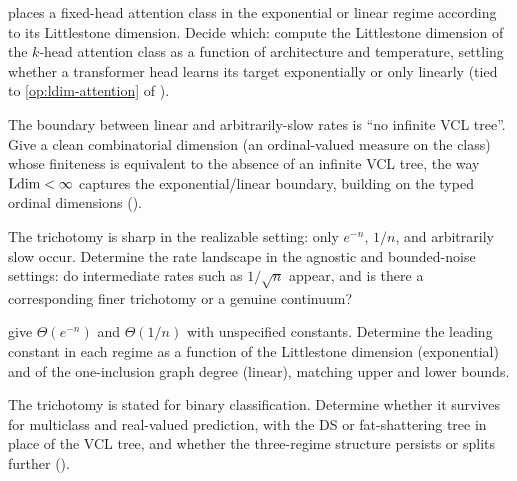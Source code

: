\begin{openprob}
\label{op:attention-regime}
 places a fixed-head attention class in the exponential or linear regime according to its Littlestone dimension.  Decide which: compute the Littlestone dimension of the $k$-head attention class as a function of architecture and temperature, settling whether a transformer head learns its target exponentially or only linearly (tied to \cref{op:ldim-attention} of ).
\end{openprob}

\begin{openprob}
\label{op:vcl-characterization}
The boundary between linear and arbitrarily-slow rates is ``no infinite VCL tree''.  Give a clean combinatorial dimension (an ordinal-valued measure on the class) whose finiteness is equivalent to the absence of an infinite VCL tree, the way $\mathrm{Ldim} < \infty$ captures the exponential/linear boundary, building on the typed ordinal dimensions ().
\end{openprob}

\begin{openprob}
\label{op:intermediate-rates}
The trichotomy is sharp in the realizable setting: only $e^{-n}$, $1/n$, and arbitrarily slow occur.  Determine the rate landscape in the agnostic and bounded-noise settings: do intermediate rates such as $1/\sqrt{n}$ appear, and is there a corresponding finer trichotomy or a genuine continuum?
\end{openprob}

\begin{openprob}
\label{op:rate-constants}
 give $\Theta(e^{-n})$ and $\Theta(1/n)$ with unspecified constants.  Determine the leading constant in each regime as a function of the Littlestone dimension (exponential) and of the one-inclusion graph degree (linear), matching upper and lower bounds.
\end{openprob}

\begin{openprob}
\label{op:universal-multiclass}
The trichotomy is stated for binary classification.  Determine whether it survives for multiclass and real-valued prediction, with the DS or fat-shattering tree in place of the VCL tree, and whether the three-regime structure persists or splits further ().
\end{openprob}

